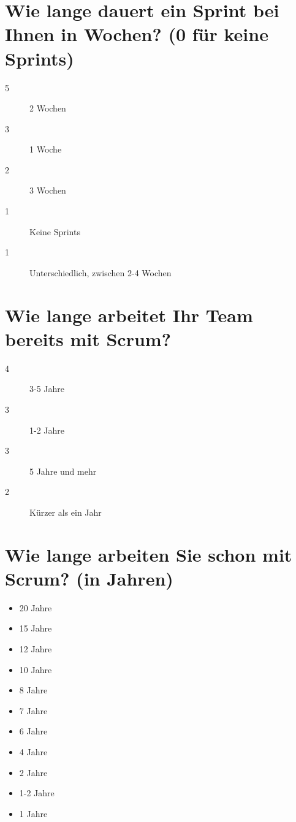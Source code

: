 \section*{Wie lange dauert ein Sprint bei Ihnen in Wochen? (0 für keine Sprints)}
\begin{description}
    \item[5 \responsecount] 2 Wochen
    \item[3 \responsecount] 1 Woche
    \item[2 \responsecount] 3 Wochen
    \item[1 \responsecount] Keine Sprints
    \item[1 \responsecount] Unterschiedlich, zwischen 2-4 Wochen
\end{description}

\section*{Wie lange arbeitet Ihr Team bereits mit Scrum?}
\begin{description}
    \item[4 \responsecount] 3-5 Jahre
    \item[3 \responsecount] 1-2 Jahre
    \item[3 \responsecount] 5 Jahre und mehr
    \item[2 \responsecount] Kürzer als ein Jahr
\end{description}

\section*{Wie lange arbeiten Sie schon mit Scrum? (in Jahren)}
\begin{itemize}
    \item[\openresponse] 20 Jahre
    \item[\openresponse] 15 Jahre
    \item[\openresponse] 12 Jahre
    \item[\openresponse] 10 Jahre
    \item[\openresponse] 8 Jahre
    \item[\openresponse] 7 Jahre
    \item[\openresponse] 6 Jahre
    \item[\openresponse] 4 Jahre
    \item[\openresponse] 2 Jahre
    \item[\openresponse] 1-2 Jahre
    \item[\openresponse] 1 Jahre
\end{itemize}

